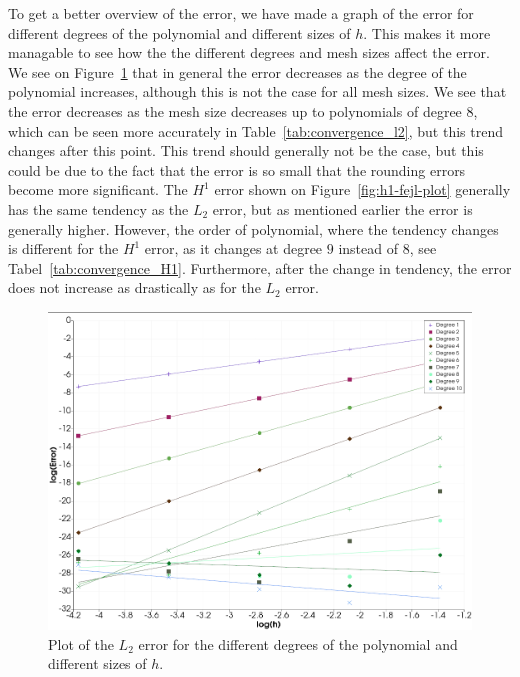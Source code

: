 To get a better overview of the error, we have made a graph of the error for different degrees of the polynomial and different sizes of $h$.
This makes it more managable to see how the the different degrees and mesh sizes affect the error. 
We see on Figure~\ref{fig:l2-fejl-plot} that in general the error decreases as the degree of the polynomial increases, although this is not the case for all mesh sizes.
We see that the error decreases as the mesh size decreases up to polynomials of degree $8$, which can be seen more accurately in Table~\ref{tab:convergence_l2}, but this trend changes after this point.
This trend should generally not be the case, but this could be due to the fact that the error is so small that the rounding errors become more significant.
The $H^1$ error shown on Figure~\ref{fig:h1-fejl-plot} generally has the same tendency as the $L_2$ error, but as mentioned earlier the error is generally higher.
However, the order of polynomial, where the tendency changes is different for the $H^1$ error, as it changes at degree $9$ instead of $8$, see Tabel~\ref{tab:convergence_H1}.
Furthermore, after the change in tendency, the error does not increase as drastically as for the $L_2$ error. 

\begin{figure}
    \begin{centering}
    \includegraphics[scale=0.6]{l2-fejl-plot.jpeg}
    \caption{Plot of the $L_2$ error for the different degrees of the polynomial and different sizes of $h$.}
    \end{centering}
    \label{fig:l2-fejl-plot}
    \end{figure}

